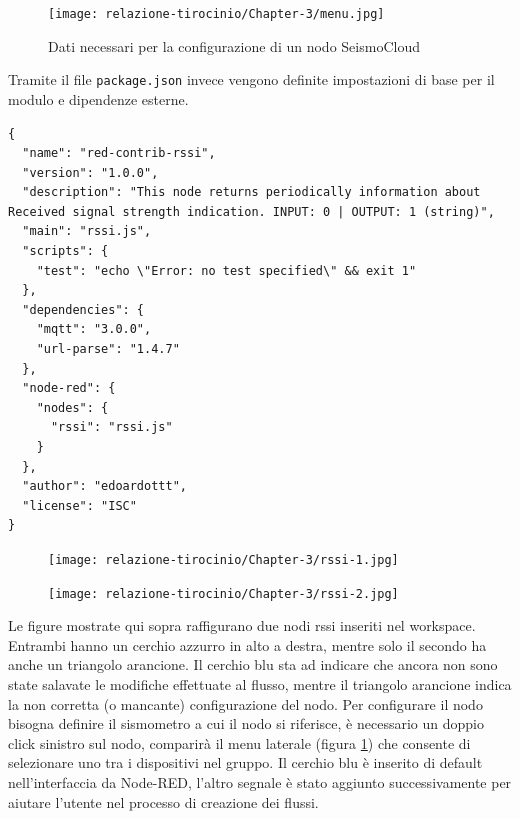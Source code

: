 \documentclass[a4paper,10pt]{memoir}
\begin{document}
\begin{figure}[ht]
    \texttt{[image: relazione-tirocinio/Chapter-3/menu.jpg]}
    \caption{Dati necessari per la configurazione di un nodo SeismoCloud}
    \label{fig:menu}
\end{figure}

\clearpage

Tramite il file \texttt{package.json} invece vengono definite impostazioni di base per il modulo e dipendenze esterne.
\begin{lstlisting}
{
  "name": "red-contrib-rssi",
  "version": "1.0.0",
  "description": "This node returns periodically information about Received signal strength indication. INPUT: 0 | OUTPUT: 1 (string)",
  "main": "rssi.js",
  "scripts": {
    "test": "echo \"Error: no test specified\" && exit 1"
  },
  "dependencies": {
    "mqtt": "3.0.0",
    "url-parse": "1.4.7"
  },
  "node-red": {
    "nodes": {
      "rssi": "rssi.js"
    }
  },
  "author": "edoardottt",
  "license": "ISC"
}
\end{lstlisting}

\begin{figure}[ht]
    \texttt{[image: relazione-tirocinio/Chapter-3/rssi-1.jpg]}
    \label{fig:rssi-1}
\end{figure}
\begin{figure}[ht]
    \texttt{[image: relazione-tirocinio/Chapter-3/rssi-2.jpg]}
    \label{fig:rssi-2}
\end{figure}
Le figure mostrate qui sopra raffigurano due nodi rssi inseriti nel workspace.
Entrambi hanno un cerchio azzurro in alto a destra, mentre solo il secondo ha anche un triangolo arancione.
Il cerchio blu sta ad indicare che ancora non sono state salavate le modifiche effettuate al flusso, mentre il triangolo arancione indica la non corretta (o mancante) configurazione del nodo.
Per configurare il nodo bisogna definire il sismometro a cui il nodo si riferisce, è necessario un doppio click sinistro sul nodo, comparirà il menu laterale (figura \ref{fig:menu}) che consente di selezionare uno tra i dispositivi nel gruppo.
Il cerchio blu è inserito di default nell'interfaccia da Node-RED, l'altro segnale è stato aggiunto successivamente per aiutare l'utente nel processo di creazione dei flussi.
\end{document}
